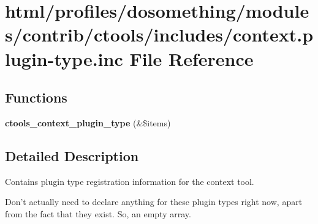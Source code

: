 \hypertarget{context_8plugin-type_8inc}{
\section{html/profiles/dosomething/modules/contrib/ctools/includes/context.plugin-\/type.inc File Reference}
\label{context_8plugin-type_8inc}
}
\subsection*{Functions}
\begin{DoxyCompactItemize}
\item 
\hypertarget{context_8plugin-type_8inc_a4350905fe5fa16c45dbe4c566594e4a0}{
{\bfseries ctools\_\-context\_\-plugin\_\-type} (\&\$items)}
\label{context_8plugin-type_8inc_a4350905fe5fa16c45dbe4c566594e4a0}

\end{DoxyCompactItemize}


\subsection{Detailed Description}
Contains plugin type registration information for the context tool.

Don't actually need to declare anything for these plugin types right now, apart from the fact that they exist. So, an empty array. 